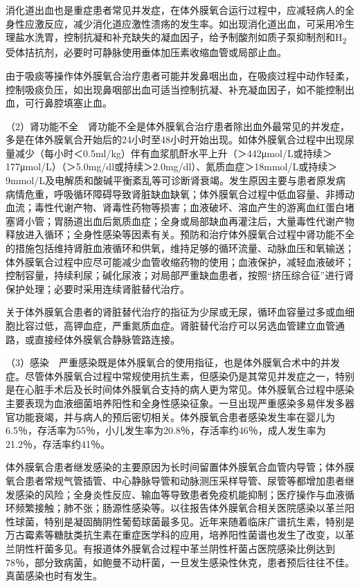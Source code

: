 消化道出血也是重症患者常见并发症，在体外膜氧合运行过程中，应减轻病人的全身性应激反应，减少消化道应激性溃疡的发生率。如出现消化道出血，可采用冷生理盐水洗胃，控制抗凝和补充缺失的凝血因子，给予制酸剂如质子泵抑制剂和H\textsubscript{2}
受体拮抗剂，必要时可静脉使用垂体加压素收缩血管或局部止血。

由于吸痰等操作体外膜氧合治疗患者可能并发鼻咽出血，在吸痰过程中动作轻柔，控制吸痰负压，如出现鼻咽部出血可适当控制抗凝、补充凝血因子，如不能控制出血，可行鼻腔填塞止血。

（2）肾功能不全　肾功能不全是体外膜氧合治疗患者除出血外最常见的并发症，多是在体外膜氧合开始后的24小时至48小时开始出现。如体外膜氧合过程中出现尿量减少（每小时＜0.5ml/kg）伴有血浆肌酐水平上升（＞442μmol/L或持续＞177μmol/L）（＞5.0mg/dl或持续＞2.0mg/dl）、氮质血症＞18mmol/L或持续＞9mmol/L及电解质和酸碱平衡紊乱等可诊断肾衰竭。发生原因主要与患者原发病病情危重，呼吸循环障碍导致肾脏缺血缺氧；体外膜氧合过程中低血容量、非搏动血流；毒性代谢产物、肾毒性药物等损害；血液破坏、溶血产生的游离血红蛋白堵塞肾小管；胃肠道出血后氮质血症；全身或局部缺血再灌注后，大量毒性代谢产物释放进入循环；全身性感染等因素有关。预防和治疗体外膜氧合过程中肾功能不全的措施包括维持肾脏血液循环和供氧，维持足够的循环流量、动脉血压和氧输送；体外膜氧合过程中应尽可能减少血管收缩药物的使用；血液保护，减轻血液破坏；控制容量，持续利尿；碱化尿液；对局部严重缺血患者，按照“挤压综合征”进行肾保护处理；必要时采用连续肾脏替代治疗。

关于体外膜氧合患者的肾脏替代治疗的指征为少尿或无尿，循环血容量过多或血细胞比容过低，高钾血症，严重氮质血症。肾脏替代治疗可以另选血管建立血管通路，或直接经体外膜氧合静脉管路连接。

（3）感染　严重感染既是体外膜氧合的使用指征，也是体外膜氧合术中的并发症。尽管体外膜氧合过程中常规使用抗生素，但感染仍是其常见并发症之一，特别是在心脏手术后及长时间体外膜氧合支持的病人更为常见。体外膜氧合过程中感染主要表现为血液细菌培养阳性和全身性感染征象。一旦出现严重感染多易伴发多器官功能衰竭，并与病人的预后密切相关。体外膜氧合患者感染发生率在婴儿为6.5％，存活率为55％，小儿发生率为20.8％，存活率约46％，成人发生率为21.2％，存活率约41％。

体外膜氧合患者继发感染的主要原因为长时间留置体外膜氧合血管内导管；体外膜氧合患者常规气管插管、中心静脉导管和动脉测压采样导管、尿管等都增加患者继发感染的风险；全身炎性反应、输血等导致患者免疫机能抑制；医疗操作与血液循环频繁接触；肺不张；肠源性感染等。以往报告体外膜氧合相关医院感染以革兰阳性球菌，特别是凝固酶阴性葡萄球菌最多见。近年来随着临床广谱抗生素，特别是万古霉素等糖肽类抗生素在重症医学科的应用，培养阳性菌谱也发生了改变，以革兰阴性杆菌多见。有报道体外膜氧合过程中革兰阴性杆菌占医院感染比例达到78％，部分致病菌，如鲍曼不动杆菌，一旦发生感染性休克，患者预后往往不佳。真菌感染也时有发生。

